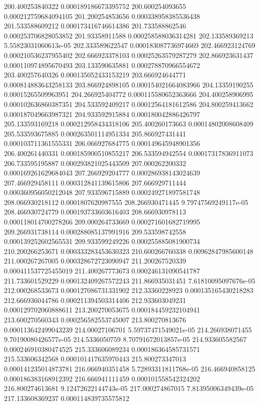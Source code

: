 {200.400253840322 0.000189186673395752
200.600254093655 0.000212759684094105
201.200254853656 0.000338958385536438
201.533588609212 0.000173416746614386
201.733588862546 0.000253706828053852
201.93358911588 0.000258588036314281
202.133589369213 5.55823031060613e-05
202.333589622547 0.000183087736974669
202.466923124769 0.000210536237955402
202.666923378103 0.00025263579287279
202.866923631437 0.000110974895670493
203.133590635881 0.000278870966554672
203.400257640326 0.000135052433153219
203.666924644771 0.000814883643258133
203.866924898105 0.000154021664083966
204.13359190255 0.00015265509963951
204.266925404772 0.000115580652363666
204.400258906995 0.000102636860387351
204.533592409217 0.00012564181612586
204.800259413662 0.000187049663987321
204.933592915884 0.000180042886426797
205.133593169218 0.000212958434318106
205.400260173663 0.00014802008608409
205.533593675885 0.000263501114951334
205.866927431441 0.000103711361555331
206.066927684775 0.000149645948901356
206.400261440331 0.000185900510855217
206.533594942554 0.00017317836911073
206.733595195887 0.000293821025443509
207.000262200332 0.000169261629684043
207.266929204777 0.000286938143024639
207.466929458111 0.000312841139615806
207.666929711444 0.000360956050212048
207.933596715889 0.000249271897581748
208.066930218112 0.0001807620987555
208.266930471445 9.79747569249117e-05
208.466930724779 0.000193733603616403
208.666930978113 0.000118014700278266
209.000264733669 0.000271601682719995
209.266931738114 0.000288085137991916
209.533598742558 0.000139252602565531
209.933599249226 0.000255885081900734
210.200266253671 0.000333283453630323
210.600266760338 0.00962847985600148
211.000267267005 0.000328672723090947
211.200267520339 0.000411537725455019
211.400267773673 0.000246131090541787
211.733601529229 0.000132409267572243
211.866935031451 7.61810095097676e-05
212.000268533673 0.000127086731331902
212.33360228923 0.000135165430218283
212.666936044786 0.000211394503314406
212.933603049231 0.000129702060888611
213.200270053675 0.000184459232104941
213.600270560343 0.000256582553745007
213.800270813676 0.000113642499043239
214.00027106701 5.59737471549021e-05
214.266938071455 9.70190080426577e-05
214.5336050759 8.70791672013857e-05
214.933605582567 0.000246910380474525
215.333606089234 0.000186364585731571
215.533606342568 0.000101417635970443
215.800273347013 0.000141235014873781
216.066940351458 5.72893311811768e-05
216.466940858125 0.000186383168912392
216.666941111459 0.000101558542324202
216.800274613681 9.12472622144743e-05
217.000274867015 7.81395006349439e-05
217.133608369237 0.000114839735575812
}
